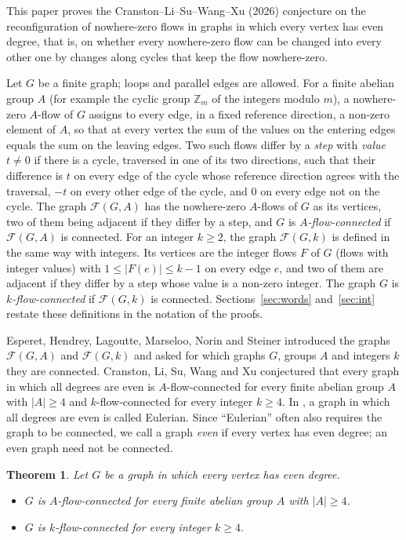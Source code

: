 \documentclass[11pt]{article}
\newtheorem{theorem}{Theorem}[section]
\theoremstyle{definition}
\newcommand{\Z}{\mathbb{Z}}
\newcommand{\cF}{\mathcal{F}}
\begin{document}
This paper proves the Cranston--Li--Su--Wang--Xu (2026) conjecture \cite[Conjecture~4.1]{CLSWX} on the
reconfiguration of nowhere-zero flows in graphs in which every vertex has even degree, that is, on whether every
nowhere-zero flow can be changed into every other one by changes along cycles that keep the flow nowhere-zero.

Let $G$ be a finite graph; loops and parallel edges are allowed. For a finite abelian group $A$ (for example the cyclic group $\Z_m$ of the integers modulo $m$), a nowhere-zero
$A$-flow of $G$ assigns to every edge, in a fixed reference direction, a non-zero element of $A$, so that at every
vertex the sum of the values on the entering edges equals the sum on the leaving edges. Two such flows differ by a
\emph{step} with \emph{value} $t\ne 0$ if there is a cycle, traversed in one of its two directions, such that their
difference is $t$ on every edge of the cycle whose reference direction agrees with the traversal, $-t$ on every other
edge of the cycle, and $0$ on every edge not on the cycle. The graph $\cF(G,A)$ has the nowhere-zero $A$-flows of $G$ as its vertices, two of them being
adjacent if they differ by a step, and $G$ is \emph{$A$-flow-connected} if $\cF(G,A)$ is connected. For an integer
$k\ge 2$, the graph $\cF(G,k)$ is defined in the same way with integers. Its vertices are the integer flows $F$ of $G$
(flows with integer values) with $1\le|F(e)|\le k-1$ on every edge $e$, and two of them are adjacent if they differ by a
step whose value is a non-zero integer. The graph $G$ is \emph{$k$-flow-connected} if $\cF(G,k)$ is connected. Sections~\ref{sec:words} and~\ref{sec:int}
restate these definitions in the notation of the proofs.

Esperet, Hendrey, Lagoutte, Marseloo, Norin and Steiner \cite{EHLMNS} introduced the graphs $\cF(G,A)$ and $\cF(G,k)$
and asked for which graphs $G$, groups $A$ and integers $k$ they are connected. Cranston, Li, Su, Wang and Xu
\cite[Conjecture~4.1]{CLSWX} conjectured that every graph in which all degrees are even is $A$-flow-connected for every finite abelian group $A$
with $|A|\ge 4$ and $k$-flow-connected for every integer $k\ge 4$. In \cite{CLSWX}, a graph in which all
degrees are even is called Eulerian. Since ``Eulerian'' often also requires the graph to be connected, we call a graph \emph{even} if every vertex
has even degree; an even graph need not be connected.

\begin{theorem}\label{thm:main}
Let $G$ be a graph in which every vertex has even degree.
\begin{itemize}
\item[(a)] $G$ is $A$-flow-connected for every finite abelian group $A$ with $|A|\ge 4$.
\item[(b)] $G$ is $k$-flow-connected for every integer $k\ge 4$.
\end{itemize}
\end{theorem}
\end{document}

